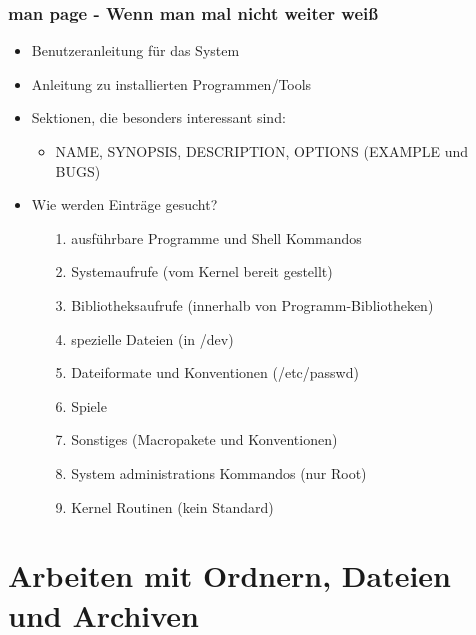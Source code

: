 \documentclass[12pt,utf8]{beamer}
\begin{document}
\begin{frame}
\frametitle{man page - Wenn man mal nicht weiter weiß}
\begin{itemize}
	\item Benutzeranleitung für das System
	\item Anleitung zu installierten Programmen/Tools
	\item Sektionen, die besonders interessant sind:
	\begin{itemize}
		\item NAME, SYNOPSIS, DESCRIPTION, OPTIONS (EXAMPLE und BUGS)
	\end{itemize}
	\item Wie werden Einträge gesucht?
	\begin{itemize}
		\item[1.] ausführbare Programme und Shell Kommandos
		\item[2.] Systemaufrufe (vom Kernel bereit gestellt)
		\item[3.] Bibliotheksaufrufe (innerhalb von Programm-Bibliotheken)
		\item[4.] spezielle Dateien (in /dev)
		\item[5.] Dateiformate und Konventionen (/etc/passwd)
		\item[6.] Spiele
		\item[7.] Sonstiges (Macropakete und Konventionen)
		\item[8.] System administrations Kommandos (nur Root)
		\item[9.] Kernel Routinen (kein Standard)
	\end{itemize}
\end{itemize}
\end{frame}


\section{Arbeiten mit Ordnern, Dateien und Archiven}
\end{document}
